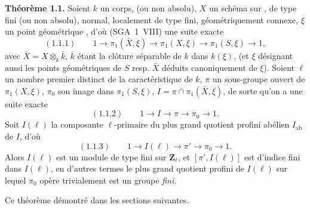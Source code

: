 \documentclass[11pt,a4paper]{article}
\begin{document}
\textbf{Théorème 1.1.} Soient $k$ un corps,  \struck{\ill{} \ill{} \ill{}} (ou non absolu), $X$ un schéma sur  , \struck{\ill{}} de type fini (ou non absolu), normal, localement de type fini, géométriquement connexe, $\xi$ un point géométrique , d'où (SGA~1~VIII) une suite exacte
\[
(1.1.1) \qquad 1 \to \pi_1(\bar X, \xi) \longrightarrow \pi_1(X, \xi) \longrightarrow \pi_1(S, \xi) \longrightarrow 1 ,
\]
avec \struck{\ill{}} $\bar X = X \otimes_k \bar k$, $\bar k$ étant la clôture séparable de $k$ dans $k(\xi)$, (et $\xi$ désignant aussi les points géométriques de $S$ resp. $\bar X$ déduits canoniquement de $\xi$).   Soient $\ell$ un nombre premier distinct de la caractéristique \struck{\ill{}} de $k$, \struck{\ill{}} $\pi$ un sous-groupe ouvert de $\pi_1(X,\xi)$, $\pi_0$ son image dans $\pi_1(S,\xi)$, $I = \pi \cap \pi_1(\bar X, \xi)$, de sorte qu'on a une suite exacte
\[
(1.1.2) \qquad 1 \longrightarrow I \longrightarrow \pi \longrightarrow \pi_0 \longrightarrow 1 .
\]
Soit $I(\ell)$ la composante $\ell$-primaire du plus grand quotient profini abélien $I_{\mathrm{ab}}$ de $I$,  d'où 
\[
(1.1.3) \qquad 1 \longrightarrow I(\ell) \longrightarrow \pi' \longrightarrow \pi_0 \longrightarrow 1 .
\]
Alors \struck{\ill{}} $I(\ell)$ est un module de type fini sur $\mathbf{Z}_\ell$, et $[\pi', I(\ell)]$  est d'indice fini dans $I(\ell)$, en d'autres termes \struck{\ill{}} le plus grand quotient profini de $I(\ell)$ sur lequel $\pi_0$ opère trivialement est un groupe \emph{fini}.

Ce théorème  démontré dans les sections suivantes.

\end{document}
